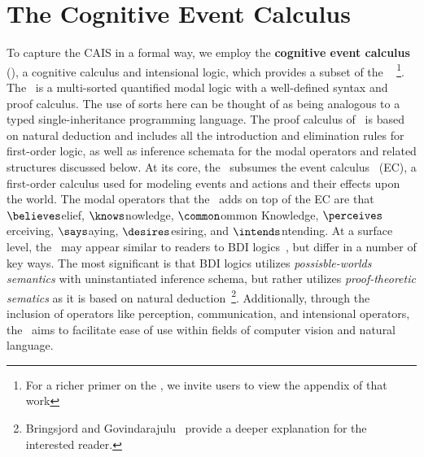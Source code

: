 \section{The Cognitive Event Calculus}


To capture the CAIS in a formal way, we employ the
\textbf{cognitive event calculus} (\CEC), a cognitive calculus and
intensional logic, which provides a subset of the \DCEC~\cite{nsg_sb_dde_ijcai}
\footnote{For a richer primer on the \DCEC, we invite users to view the
appendix of that work}. The \CEC\ is a multi-sorted quantified modal logic with a
well-defined syntax and proof calculus. The use of sorts here can be thought of
as being analogous to a typed single-inheritance programming language. The
proof calculus of \CEC\ is based on natural deduction
\cite{gentzen_investigations_1964} and includes all the introduction and
elimination rules for first-order logic, as well as inference schemata for
the modal operators and related structures discussed below. At its core, the
\CEC\ subsumes the event calculus~\cite{mueller_commonsense_2014} (EC), a
first-order calculus used for
modeling events and actions and their effects upon the world. The modal
operators that the \CEC\ adds on top of the EC are that
$\believes$elief, $\knows$nowledge, $\common$ommon Knowledge, $\perceives$erceiving,
$\says$aying, $\desires$esiring, and $\intends$ntending. At a surface level,
the \CEC\ may appear similar to readers to BDI logics~\cite{rao_modeling_1991},
but  differ in a number of key ways. The most significant is that BDI logics
utilizes \textit{possisble-worlds semantics} with uninstantiated inference
schema, but rather utilizes \textit{proof-theoretic sematics} as it is based
on natural deduction~\cite{gentzen_untersuchungen_1935}\footnote{Bringsjord and
Govindarajulu~\cite{bringsjord_given_2012} provide a deeper explanation for
the interested reader.}. Additionally, through the inclusion of operators
like perception, communication, and intensional operators, the \CEC\ aims
to facilitate ease of use within fields of computer vision and natural language.

